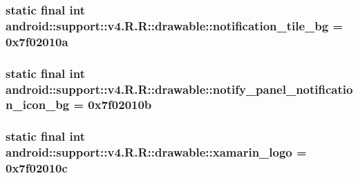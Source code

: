 \hypertarget{classandroid_1_1support_1_1v4_1_1_r_1_1drawable_2f980d0898bf42b408c1424244bcf45f}{
\subsubsection[{notification\_\-tile\_\-bg}]{\setlength{\rightskip}{0pt plus 5cm}static final int android::support::v4.R.R::drawable::notification\_\-tile\_\-bg = 0x7f02010a}}
\label{classandroid_1_1support_1_1v4_1_1_r_1_1drawable_2f980d0898bf42b408c1424244bcf45f}


\hypertarget{classandroid_1_1support_1_1v4_1_1_r_1_1drawable_1cfdcfd7af383c8e3ae71ec746a9020a}{
\subsubsection[{notify\_\-panel\_\-notification\_\-icon\_\-bg}]{\setlength{\rightskip}{0pt plus 5cm}static final int android::support::v4.R.R::drawable::notify\_\-panel\_\-notification\_\-icon\_\-bg = 0x7f02010b}}
\label{classandroid_1_1support_1_1v4_1_1_r_1_1drawable_1cfdcfd7af383c8e3ae71ec746a9020a}


\hypertarget{classandroid_1_1support_1_1v4_1_1_r_1_1drawable_176ad49d5245bbceba4ede9824317f46}{
\subsubsection[{xamarin\_\-logo}]{\setlength{\rightskip}{0pt plus 5cm}static final int android::support::v4.R.R::drawable::xamarin\_\-logo = 0x7f02010c}}
\label{classandroid_1_1support_1_1v4_1_1_r_1_1drawable_176ad49d5245bbceba4ede9824317f46}




